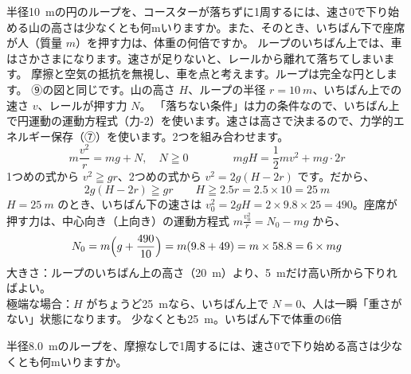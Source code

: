 \label{ph:力-4:ex2}
\begin{phreidai}
半径\qty{10}{m}の円のループを、コースターが落ちずに1周するには、速さ0で下り始める山の高さは少なくとも何mいりますか。また、そのとき、いちばん下で座席が人（質量 $m$）を押す力は、体重の何倍ですか。
\phbamen
ループのいちばん上では、車はさかさまになります。速さが足りないと、レールから離れて落ちてしまいます。
\phmushi
摩擦と空気の抵抗を無視し、車を点と考えます。ループは完全な円とします。
\phzu
⑨の図と同じです。山の高さ $H$、ループの半径 $r=\qty{10}{m}$、いちばん上での速さ $v$、レールが押す力 $N$。
\phriyu
「落ちない条件」は力の条件なので、いちばん上で円運動の運動方程式（力-2）を使います。速さは高さで決まるので、力学的エネルギー保存（⑦）を使います。2つを組み合わせます。
\phtateru
\[m\frac{v^2}{r}=mg+N,\quad N\geqq0\qquad\qquad mgH=\frac{1}{2}mv^2+mg\cdot2r\]
\phtoku
1つめの式から $v^2\geqq gr$、2つめの式から $v^2=2g(H-2r)$ です。だから、
\[2g(H-2r)\geqq gr\qquad H\geqq2.5r=2.5\times10=\qty{25}{m}\]
$H=\qty{25}{m}$ のとき、いちばん下の速さは $v_0^2=2gH=2\times9.8\times25=490$。座席が押す力は、中心向き（上向き）の運動方程式 $m\tfrac{v_0^2}{r}=N_0-mg$ から、
\[N_0=m\Bigl(g+\frac{490}{10}\Bigr)=m(9.8+49)=m\times58.8=6\times mg\]
\phtashikame
大きさ：ループのいちばん上の高さ（\qty{20}{m}）より、\qty{5}{m}だけ高い所から下りればよい。\\
極端な場合：$H$ がちょうど\qty{25}{m}なら、いちばん上で $N=0$、人は一瞬「重さがない」状態になります。
\kotae 少なくとも\qty{25}{m}。いちばん下で体重の6倍
\end{phreidai}
\begin{jibun}
半径\qty{8.0}{m}のループを、摩擦なしで1周するには、速さ0で下り始める高さは少なくとも何mいりますか。
\end{jibun}

